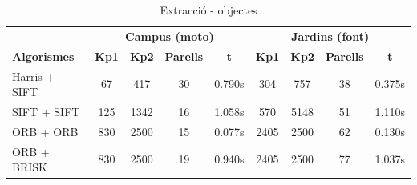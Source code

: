 		\begin{table}[H]
			\begin{center}
				\begin{tabular}{l | c c c c | c c c c}
					& \multicolumn{4}{c|}{\textbf{Campus (moto)}} & \multicolumn{4}{c}{\textbf{Jardins (font)}} \\
					\textbf{Algorismes} & \textbf{Kp1} & \textbf{Kp2} & \textbf{Parells} & \textbf{t} & \textbf{Kp1} & \textbf{Kp2} & \textbf{Parells} & \textbf{t} \\ \hline
					Harris + SIFT & 67 & 417 & 30 & 0.790s & 304 & 757 & 38 & 0.375s \\
					SIFT + SIFT & 125 & 1342 & 16 & 1.058s & 570 & 5148 & 51 & 1.110s \\
					ORB + ORB & 830 & 2500 & 15 & 0.077s & 2405 & 2500 & 62 & 0.130s \\
					ORB + BRISK & 830 & 2500 & 19 & 0.940s & 2405 & 2500 & 77 & 1.037s \\
				\end{tabular}
			\end{center}
			\caption{Extracció - objectes}
		\end{table}


